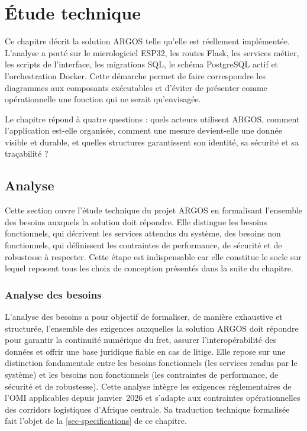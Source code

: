 \chapter{Étude technique}
\label{chap-etude-technique}

Ce chapitre décrit la solution ARGOS telle qu'elle est réellement implémentée.
L'analyse a porté sur le micrologiciel ESP32, les routes Flask, les services
métier, les scripts de l'interface, les migrations SQL, le schéma PostgreSQL
actif et l'orchestration Docker. Cette démarche permet de faire correspondre
les diagrammes aux composants exécutables et d'éviter de présenter comme
opérationnelle une fonction qui ne serait qu'envisagée.

Le chapitre répond à quatre questions : quels acteurs utilisent ARGOS, comment
l'application est-elle organisée, comment une mesure devient-elle une donnée
visible et durable, et quelles structures garantissent son identité, sa
sécurité et sa traçabilité ?

\section{Analyse}

Cette section ouvre l'étude technique du projet ARGOS en formalisant l'ensemble des besoins auxquels la solution doit répondre. Elle distingue les besoins fonctionnels, qui décrivent les services attendus du système, des besoins non fonctionnels, qui définissent les contraintes de performance, de sécurité et de robustesse à respecter. Cette étape est indispensable car elle constitue le socle sur lequel reposent tous les choix de conception présentés dans la suite du chapitre.

\subsection{Analyse des besoins}

L'analyse des besoins a pour objectif de formaliser, de manière exhaustive et structurée, l'ensemble des exigences auxquelles la solution ARGOS doit répondre pour garantir la continuité numérique du fret, assurer l'interopérabilité des données et offrir une base juridique fiable en cas de litige. Elle repose sur une distinction fondamentale entre les besoins fonctionnels (les services rendus par le système) et les besoins non fonctionnels (les contraintes de performance, de sécurité et de robustesse). Cette analyse intègre les exigences réglementaires de l'OMI applicables depuis janvier~2026 et s'adapte aux contraintes opérationnelles des corridors logistiques d'Afrique centrale. Sa traduction technique formalisée fait l'objet de la \cref{sec-specifications} de ce chapitre.

